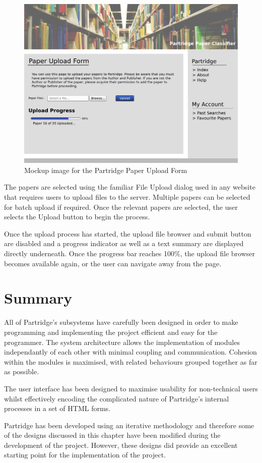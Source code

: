 \begin{figure}[!htb]
\vspace{5mm}
\centering
\includegraphics[width=\textwidth]{images/design/upload_mockup.png}
\caption{Mockup image for the Partridge Paper Upload Form}
\label{fig:paper_upload}
\end{figure}

The papers are selected using the familiar File Upload dialog used in any
website that requires users to upload files to the server. Multiple papers can
be selected for batch upload if required. Once the relevant papers are
selected, the user selects the Upload button to begin the process. 

Once the upload process has started, the upload file browser and submit button
are disabled and a progress indicator as well as a text summary are displayed
directly underneath. Once the progress bar reaches 100\%, the upload file
browser becomes available again, or the user can navigate away from the page.

\section{ Summary}

All of Partridge's subsystems have carefully been designed in order to make
programming and implementing the project efficient and easy for the programmer.
The system architecture allows the implementation of modules independantly of
each other with minimal coupling and communication. Cohesion within the modules
is maximised, with related behaviours grouped together as far as possible.

The user interface has been designed to maximise usability for non-technical
users whilst effectively encoding the complicated nature of Partridge's
internal processes in a set of HTML forms.

Partridge has been developed using an iterative methodology and therefore some
of the designs discussed in this chapter have been modified during the
development of the project. However, these designs did provide an excellent
starting point for the implementation of the project.

